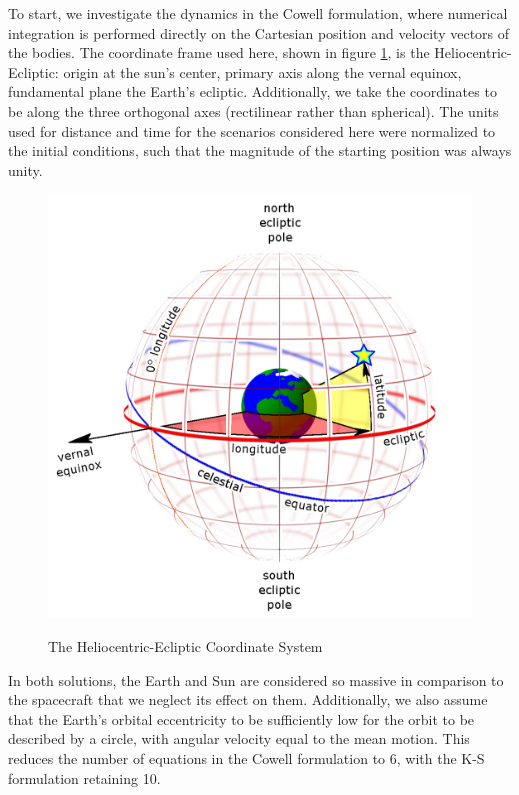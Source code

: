 \documentclass[11pt,twoside,letterpaper]{article}
\begin{document}
  To start, we investigate the dynamics in the Cowell formulation,
  where numerical integration is performed directly on the Cartesian
  position and velocity vectors of the bodies. The coordinate frame
  used here, shown in figure \ref{coords}, is the
  Heliocentric-Ecliptic: origin at the sun's center, primary axis
  along the vernal equinox, fundamental plane the Earth's
  ecliptic. Additionally, we take the coordinates to be along the
  three orthogonal axes (rectilinear rather than spherical). The units
  used for distance and time for the scenarios considered here were
  normalized to the initial conditions, such that the magnitude of the
  starting position was always unity.

  \begin{figure}
    \caption{The Heliocentric-Ecliptic Coordinate System}
    \centering
    \includegraphics[scale=0.15]{HeliocentricEcliptic}
    \label{coords}
  \end{figure}
  
  In both solutions, the Earth and Sun are considered so massive in
  comparison to the spacecraft that we neglect its effect on
  them. Additionally, we also assume that the Earth's orbital
  eccentricity to be sufficiently low for the orbit to be described by
  a circle, with angular velocity equal to the mean motion. This
  reduces the number of equations in the Cowell formulation to 6, with
  the K-S formulation retaining 10.
\end{document}
